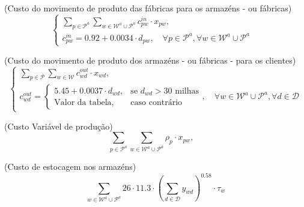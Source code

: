 \documentclass[12pt,a4paper]{article}
\begin{document}

(Custo do movimento de produto das fábricas para os armazéns - ou fábricas)
\begin{equation}
\begin{cases}
    \sum_{p \in \mathcal{P}^{a}} \sum_{w \in \mathcal{W}^{a} \cup \mathcal{P}^{a}} c^{in}_{pw} \cdot x_{pw}, & \\
    c^{in}_{pw} = 0.92 + 0.0034 \cdot d_{pw}, \quad \forall p \in \mathcal{P}^{a}, \forall w \in \mathcal{W}^{a} \cup \mathcal{P}^{a}
\end{cases}
\end{equation}

(Custo do movimento de produto dos armazéns - ou fábricas - para os clientes)
\begin{equation}
\begin{cases}
    \sum_{p \in \mathcal{P}} \sum_{w \in \mathcal{W}} c^{out}_{wd} \cdot x_{wd}, \\
    c^{out}_{wd} = \begin{cases}
        5.45 + 0.0037 \cdot d_{wd}, & \text{se } d_{wd} > 30\text{ milhas} \\
        \text{Valor da tabela}, & \text{caso contrário}
        \end{cases}, \quad \forall w \in \mathcal{W}^{a} \cup \mathcal{P}^{a}, \forall d \in \mathcal{D}
\end{cases}
\end{equation}

\begin{center}
    (Custo Variável de produção)
    \begin{equation}
        \sum_{p \in \mathcal{P}^{a}} \sum_{w \in \mathcal{W}^{a} \cup \mathcal{P}^{a}} \rho_{p} \cdot x_{pw}, \quad
    \end{equation}
\end{center}

\begin{center}
    (Custo de estocagem nos armazéns)
    \begin{equation}
        \sum_{w \in \mathcal{W}^{a} \cup \mathcal{P}^{a}} 26 \cdot 11.3 \cdot (\sum_{d \in \mathcal{D}} y_{wd})^{0.58} \cdot \tau_{w}
    \end{equation}
\end{center}
\end{document}
